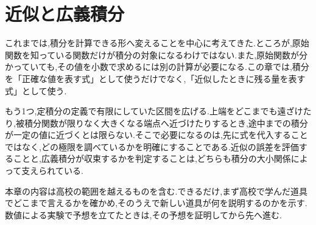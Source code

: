\chapter{近似と広義積分}\label{章:近似と広義積分}

これまでは,積分を計算できる形へ変えることを中心に考えてきた.ところが,原始関数を知っている関数だけが積分の対象になるわけではない.また,原始関数が分かっていても,その値を小数で求めるには別の計算が必要になる.この章では,積分を「正確な値を表す式」として使うだけでなく,「近似したときに残る量を表す式」として使う.

もう1つ,定積分の定義で有限にしていた区間を広げる.上端をどこまでも遠ざけたり,被積分関数が限りなく大きくなる端点へ近づけたりするとき,途中までの積分が一定の値に近づくとは限らない.そこで必要になるのは,先に式を代入することではなく,どの極限を調べているかを明確にすることである.近似の誤差を評価することと,広義積分が収束するかを判定することは,どちらも積分の大小関係によって支えられている.

本章の内容は高校の範囲を越えるものを含む.できるだけ,まず高校で学んだ道具でどこまで言えるかを確かめ,そのうえで新しい道具が何を説明するのかを示す.数値による実験で予想を立てたときは,その予想を証明してから先へ進む.

%
%
%
%
%
%
